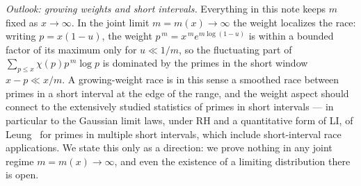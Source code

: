 \documentclass[11pt]{article}
\begin{document}
\emph{Outlook: growing weights and short intervals.} Everything in
this note keeps $m$ fixed as $x\to\infty$. In the joint limit
$m=m(x)\to\infty$ the weight localizes the race: writing $p=x(1-u)$,
the weight $p^{\,m}=x^{\,m}e^{m\log(1-u)}$ is within a bounded factor
of its maximum only for $u\ll1/m$, so the fluctuating part of
$\sum_{p\le x}\chi(p)p^{\,m}\log p$ is dominated by the primes in the
short window $x-p\ll x/m$. A growing-weight race is in this sense a
smoothed race between primes in a short interval at the edge of the
range, and the weight aspect should connect to the extensively studied
statistics of primes in short intervals --- in particular to the
Gaussian limit laws, under RH and a quantitative form of LI, of
Leung~\cite{Leung24} for primes in multiple short intervals, which
include short-interval race applications. We state this only as a
direction: we prove nothing in any joint regime $m=m(x)\to\infty$, and
even the existence of a limiting distribution there is open.
\end{document}
